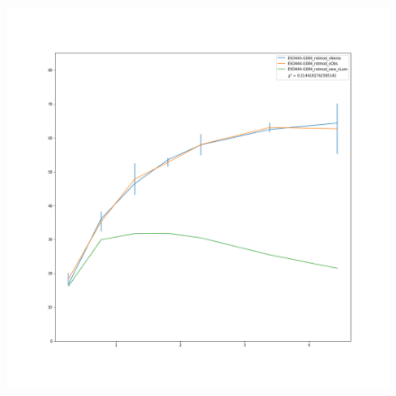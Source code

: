 \documentclass[reprint,%
 amsmath,amssymb,
 aps,
]{revtex4-1}
\begin{document}
\begin{figure}
\begin{minipage}{.5\textwidth}
  \includegraphics[width=.8\linewidth]{figures/ESO444-G084_rotmod_XueSofue.png}
  \label{fig:test2}
\end{minipage}
\end{figure}
\end{document}
